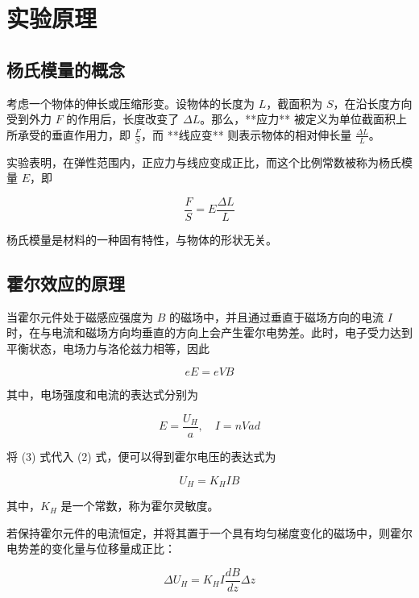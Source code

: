 \documentclass[UTF-8,twoside,cs4size]{ctexart}
\begin{document}
\section{实验原理}
\subsection{杨氏模量的概念}
考虑一个物体的伸长或压缩形变。设物体的长度为 $L$，截面积为 $S$，在沿长度方向受到外力 $F$ 的作用后，长度改变了 $\Delta L$。那么，**应力** 被定义为单位截面积上所承受的垂直作用力，即 $\frac{F}{S}$，而 **线应变** 则表示物体的相对伸长量 $\frac{\Delta L}{L}$。

实验表明，在弹性范围内，正应力与线应变成正比，而这个比例常数被称为杨氏模量 $E$，即

\begin{equation}
    \frac{F}{S} = E \frac{\Delta L}{L}
\end{equation}

杨氏模量是材料的一种固有特性，与物体的形状无关。

\subsection{霍尔效应的原理}

当霍尔元件处于磁感应强度为 $B$ 的磁场中，并且通过垂直于磁场方向的电流 $I$ 时，在与电流和磁场方向均垂直的方向上会产生霍尔电势差。此时，电子受力达到平衡状态，电场力与洛伦兹力相等，因此

\begin{equation}
    eE = eVB
\end{equation}

其中，电场强度和电流的表达式分别为

\begin{equation}
    E = \frac{U_H}{a}, \quad I = nVad
\end{equation}

将 (3) 式代入 (2) 式，便可以得到霍尔电压的表达式为

\begin{equation}
    U_H = K_H I B
\end{equation}

其中，$K_H$ 是一个常数，称为霍尔灵敏度。\par
若保持霍尔元件的电流恒定，并将其置于一个具有均匀梯度变化的磁场中，则霍尔电势差的变化量与位移量成正比：

\begin{equation}
    \Delta U_H = K_H I \frac{dB}{dz} \Delta z
\end{equation}
\end{document}

